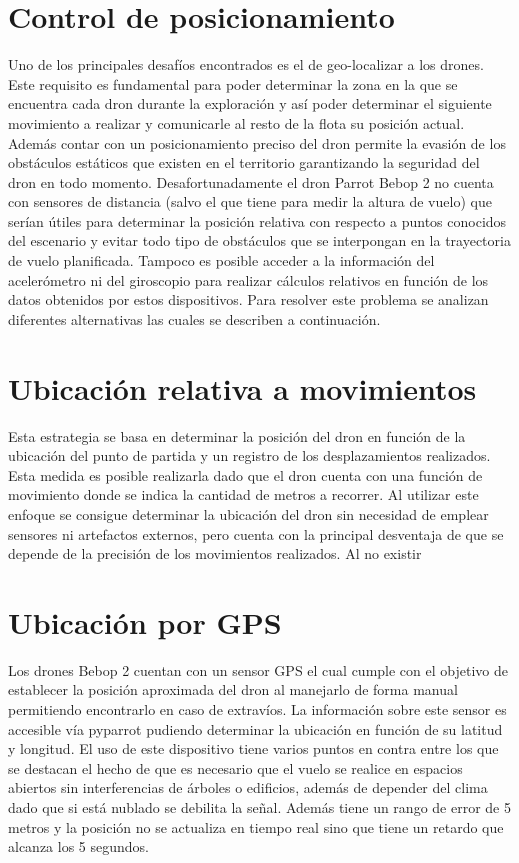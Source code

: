 \section {Control de posicionamiento}
Uno de los principales desafíos encontrados es el de geo-localizar a los drones. Este requisito es fundamental para poder determinar la zona en la que se encuentra cada dron durante la exploración y así poder determinar el siguiente movimiento a realizar y comunicarle al resto de la flota su posición actual. Además contar con un posicionamiento preciso del dron permite la evasión de los obstáculos estáticos que existen en el territorio garantizando la seguridad del dron en todo momento.
Desafortunadamente el dron Parrot Bebop 2 no cuenta con sensores de distancia (salvo el que tiene para medir la altura de vuelo) que serían útiles para determinar la posición relativa con respecto a puntos conocidos del escenario y evitar todo tipo de obstáculos que se interpongan en la trayectoria de vuelo planificada. Tampoco es posible acceder a la información del acelerómetro ni del giroscopio para realizar cálculos relativos en función de los datos obtenidos por estos dispositivos.
Para resolver este problema se analizan diferentes alternativas las cuales se describen a continuación.
\section {Ubicación relativa a  movimientos}
Esta estrategia se basa en determinar la posición del dron en función de la ubicación del  punto de partida y un registro de los desplazamientos realizados. Esta medida es posible realizarla dado que el dron cuenta con una función de movimiento donde se indica la cantidad de metros a recorrer.
Al utilizar este enfoque se consigue determinar la ubicación del dron sin necesidad de emplear sensores ni artefactos externos, pero cuenta con la principal desventaja de que se depende de la precisión de los movimientos realizados. Al no existir
\section {Ubicación por GPS}
Los drones Bebop 2 cuentan con un sensor GPS el cual cumple con el objetivo de establecer la posición aproximada del dron al manejarlo de forma manual permitiendo encontrarlo en caso de extravíos.
La información sobre este sensor es accesible vía pyparrot pudiendo determinar la ubicación en función de su latitud y longitud.
El uso de este dispositivo tiene varios puntos en contra entre los que se destacan el hecho de que es necesario que el vuelo se realice en espacios abiertos sin interferencias de árboles o edificios, además de depender del clima dado que si está nublado se debilita la señal. Además tiene un rango de error de 5 metros y la posición no se actualiza en tiempo real sino que tiene un retardo que alcanza los 5 segundos.
